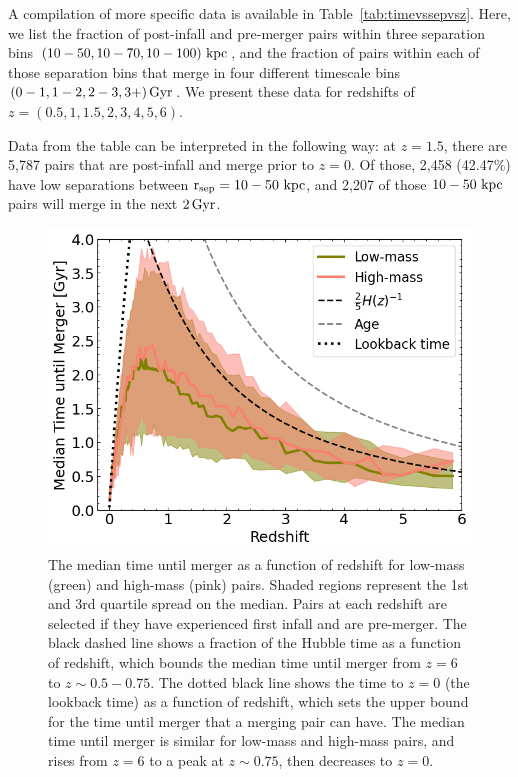 \documentclass[twocolumn,linenumbers]{aastex631}
\newcommand{\rsep}{\ensuremath{\rm r_{sep}}}
\begin{document}
% 

A compilation of more specific data is available in Table~\ref{tab:timevssepvsz}.
Here, we list the fraction of post-infall and pre-merger pairs within three separation bins $(10-50, 10-70, 10-100)\,\mathrm{\,kpc}$, and the fraction of pairs within each of those separation bins that merge in four different timescale bins $(0-1, 1-2, 2-3, 3+)\,\mathrm{Gyr}$.
We present these data for redshifts of $z=(0.5,1,1.5,2,3,4,5,6)$.

Data from the table can be interpreted in the following way: at $z=1.5$, there are 5,787 pairs that are post-infall and merge prior to $z=0$. 
Of those, 2,458 (42.47\%) have low separations between $\rsep=10-50\,\kpc$, and 2,207 of those $10-50\,\mathrm{\,kpc}$ pairs will merge in the next $2\,\mathrm{Gyr}$. 

\begin{figure}[htb]
    \centering
    \includegraphics[width=\columnwidth]{plots/bet-on-it/8_timescale_mod.png}
    \caption{The median time until merger as a function of redshift for low-mass (green) and high-mass (pink) pairs. Shaded regions represent the 1st and 3rd quartile spread on the median. Pairs at each redshift are selected if they have experienced first infall and are pre-merger. 
    The black dashed line shows a fraction of the Hubble time as a function of redshift, which bounds the median time until merger from $z=6$ to $z\sim0.5-0.75$.
    The dotted black line shows the time to $z=0$ (the lookback time) as a function of redshift, which sets the upper bound for the time until merger that a merging pair can have. 
    The median time until merger is similar for low-mass and high-mass pairs, and rises from $z=6$ to a peak at $z\sim0.75$, then decreases to $z=0$.}
    \label{fig:timescales}
\end{figure}
\end{document}
